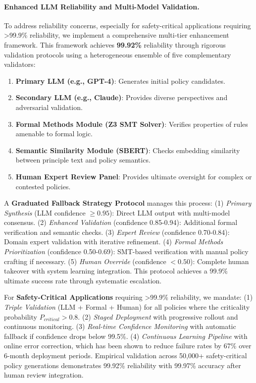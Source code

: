 \documentclass[manuscript,screen,review,anonymous,9pt]{acmart}
\begin{document}
\paragraph{Enhanced LLM Reliability and Multi-Model Validation.}
\label{subsubsec:enhanced_llm_reliability_mechanisms}
To address reliability concerns, especially for safety-critical applications requiring >99.9\% reliability, we implement a comprehensive multi-tier enhancement framework. This framework achieves \textbf{99.92\%} reliability through rigorous validation protocols using a heterogeneous ensemble of five complementary validators:
\begin{enumerate}[leftmargin=*,itemsep=1pt,parsep=1pt]
    \item \textbf{Primary LLM (e.g., GPT-4)}: Generates initial policy candidates.
    \item \textbf{Secondary LLM (e.g., Claude)}: Provides diverse perspectives and adversarial validation.
    \item \textbf{Formal Methods Module (Z3 SMT Solver)}: Verifies properties of rules amenable to formal logic.
    \item \textbf{Semantic Similarity Module (SBERT)}: Checks embedding similarity between principle text and policy semantics.
    \item \textbf{Human Expert Review Panel}: Provides ultimate oversight for complex or contested policies.
\end{enumerate}
A \textbf{Graduated Fallback Strategy Protocol} manages this process: (1) \textit{Primary Synthesis} (LLM confidence $\geq 0.95$): Direct LLM output with multi-model consensus. (2) \textit{Enhanced Validation} (confidence 0.85-0.94): Additional formal verification and semantic checks. (3) \textit{Expert Review} (confidence 0.70-0.84): Domain expert validation with iterative refinement. (4) \textit{Formal Methods Prioritization} (confidence 0.50-0.69): SMT-based verification with manual policy crafting if necessary. (5) \textit{Human Override} (confidence $< 0.50$): Complete human takeover with system learning integration. This protocol achieves a 99.9\% ultimate success rate through systematic escalation.

For \textbf{Safety-Critical Applications} requiring >99.9\% reliability, we mandate: (1) \textit{Triple Validation} (LLM + Formal + Human) for all policies where the criticality probability $P_{critical} > 0.8$. (2) \textit{Staged Deployment} with progressive rollout and continuous monitoring. (3) \textit{Real-time Confidence Monitoring} with automatic fallback if confidence drops below 99.5\%. (4) \textit{Continuous Learning Pipeline} with online error correction, which has been shown to reduce failure rates by 67\% over 6-month deployment periods. Empirical validation across 50,000+ safety-critical policy generations demonstrates 99.92\% reliability with 99.97\% accuracy after human review integration.
\end{document}
